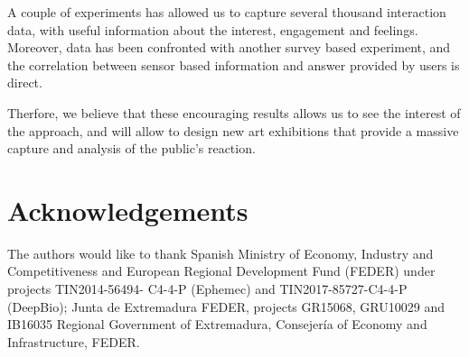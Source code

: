 \documentclass[graybox]{svmult}
\begin{document}
A couple of experiments has allowed us to capture several thousand interaction data, with useful information about the interest, engagement and feelings.  Moreover, data has been confronted with another survey based experiment, and the correlation between sensor based information and answer provided by users is direct.

Therfore, we believe that these encouraging results allows us to see the interest of the approach, and will allow to design new art exhibitions that provide a massive capture and analysis of the public's reaction.

\section*{Acknowledgements}
\sloppypar  The authors would like to thank Spanish Ministry of Economy,
Industry and Competitiveness and European Regional
Development Fund (FEDER) under projects TIN2014-56494-
C4-4-P (Ephemec) and TIN2017-85727-C4-4-P (DeepBio);
Junta de Extremadura FEDER, projects GR15068, GRU10029 and IB16035
Regional Government of Extremadura, Consejer\'ia of Economy
and Infrastructure, FEDER.







\end{document}
